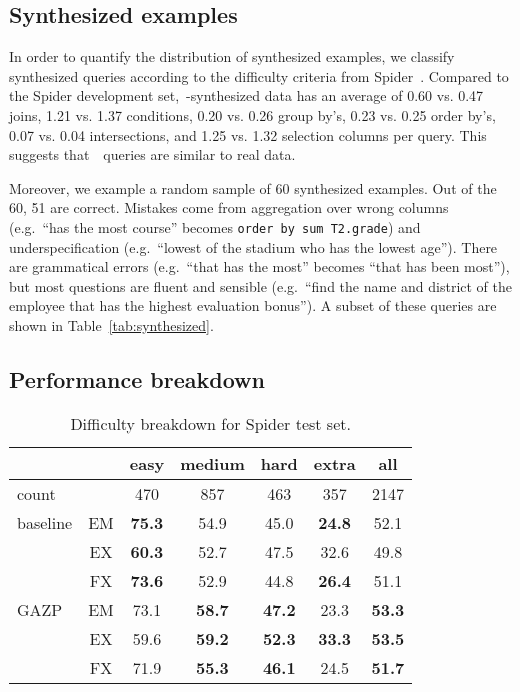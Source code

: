 \documentclass[11pt,a4paper]{article}
\begin{document}
\subsection{Synthesized examples}
\label{app:synthesized}

In order to quantify the distribution of synthesized examples, we classify synthesized queries according to the difficulty criteria from Spider~\citep{yu2018spider}.
Compared to the Spider development set,~\modelnameshort-synthesized data has an average of 0.60 vs. 0.47 joins, 1.21 vs. 1.37 conditions, 0.20 vs. 0.26 group by’s, 0.23 vs. 0.25 order by’s, 0.07 vs. 0.04 intersections, and 1.25 vs. 1.32 selection columns per query.
This suggests that~\modelnameshort~queries are similar to real data.

Moreover, we example a random sample of 60 synthesized examples.
Out of the 60, 51 are correct.
Mistakes come from aggregation over wrong columns (e.g.~``has the most course'' becomes \texttt{order by sum T2.grade}) and underspecification (e.g.~``lowest of the stadium who has the lowest age'').
There are grammatical errors (e.g.~``that has the most'' becomes ``that has been most''), but most questions are fluent and sensible (e.g.~``find the name and district of the employee that has the highest evaluation bonus'').
A subset of these queries are shown in Table~\ref{tab:synthesized}.





\subsection{Performance breakdown}
\label{app:breakdown}


\begin{table}[ht]
\centering
\addtolength{\tabcolsep}{-1.7pt}
\begin{tabular}{@{}lcccccc@{}}
\toprule
         &    & easy & medium & hard & extra & all  \\ \midrule
count    &    & 470  & 857    & 463  & 357   & 2147 \\ \midrule
baseline & EM & \textbf{75.3} & 54.9   & 45.0 & \textbf{24.8}  & 52.1 \\
         & EX & \textbf{60.3} & 52.7   & 47.5 & 32.6  & 49.8 \\
         & FX & \textbf{73.6} & 52.9   & 44.8 & \textbf{26.4}  & 51.1 \\ \midrule
GAZP     & EM & 73.1 & \textbf{58.7}   & \textbf{47.2} & 23.3  & \textbf{53.3} \\
         & EX & 59.6 & \textbf{59.2}   & \textbf{52.3} & \textbf{33.3}  & \textbf{53.5} \\
         & FX & 71.9 & \textbf{55.3}   & \textbf{46.1} & 24.5  & \textbf{51.7} \\ \bottomrule
\end{tabular}
\caption{Difficulty breakdown for Spider test set.}
\label{tab:breakdown-spider}
\end{table}
\end{document}
